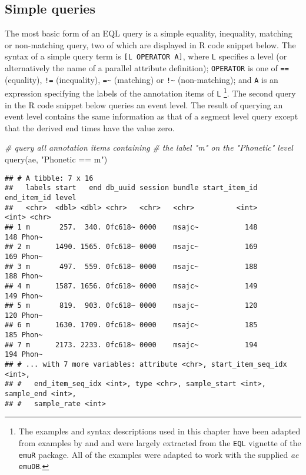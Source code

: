 \documentclass[
]{book}
\newenvironment{Shaded}{\begin{snugshade}}{\end{snugshade}}
\newcommand{\CommentTok}[1]{\textcolor[rgb]{0.56,0.35,0.01}{\textit{#1}}}
\newcommand{\FunctionTok}[1]{\textcolor[rgb]{0.00,0.00,0.00}{#1}}
\newcommand{\NormalTok}[1]{#1}
\newcommand{\StringTok}[1]{\textcolor[rgb]{0.31,0.60,0.02}{#1}}
\begin{document}
\hypertarget{simple-queries}{%
\subsection{Simple queries}\label{simple-queries}}

The most basic form of an EQL query is a simple equality, inequality, matching or non-matching query, two of which are displayed in R code snippet below. The syntax of a simple query term is \texttt{{[}L\ OPERATOR\ A{]}}, where \texttt{L} specifies a level (or alternatively the name of a parallel attribute definition); \texttt{OPERATOR} is one of \texttt{==} (equality), \texttt{!=} (inequality), \texttt{=\textasciitilde{}} (matching) or \texttt{!\textasciitilde{}} (non-matching); and \texttt{A} is an expression specifying the labels of the annotation items of \texttt{L} \footnote{The examples and syntax descriptions used in this chapter have been adapted from examples by \citet{cassidy:sc2001a} and \citet{harrington:2002aa} and were largely extracted from the \texttt{EQL} vignette of the \texttt{emuR} package. All of the examples were adapted to work with the supplied \emph{ae} \texttt{emuDB}.}. The second query in the R code snippet below queries an event level. The result of querying an event level contains the same information as that of a segment level query except that the derived end times have the value zero.

\begin{Shaded}
\begin{Highlighting}[]
\CommentTok{\# query all annotation items containing}
\CommentTok{\# the label "m" on the "Phonetic" level}
\FunctionTok{query}\NormalTok{(ae, }\StringTok{"Phonetic == m"}\NormalTok{)}
\end{Highlighting}
\end{Shaded}

\begin{verbatim}
## # A tibble: 7 x 16
##   labels start   end db_uuid session bundle start_item_id end_item_id level
##   <chr>  <dbl> <dbl> <chr>   <chr>   <chr>          <int>       <int> <chr>
## 1 m       257.  340. 0fc618~ 0000    msajc~           148         148 Phon~
## 2 m      1490. 1565. 0fc618~ 0000    msajc~           169         169 Phon~
## 3 m       497.  559. 0fc618~ 0000    msajc~           188         188 Phon~
## 4 m      1587. 1656. 0fc618~ 0000    msajc~           149         149 Phon~
## 5 m       819.  903. 0fc618~ 0000    msajc~           120         120 Phon~
## 6 m      1630. 1709. 0fc618~ 0000    msajc~           185         185 Phon~
## 7 m      2173. 2233. 0fc618~ 0000    msajc~           194         194 Phon~
## # ... with 7 more variables: attribute <chr>, start_item_seq_idx <int>,
## #   end_item_seq_idx <int>, type <chr>, sample_start <int>, sample_end <int>,
## #   sample_rate <int>
\end{verbatim}
\end{document}
